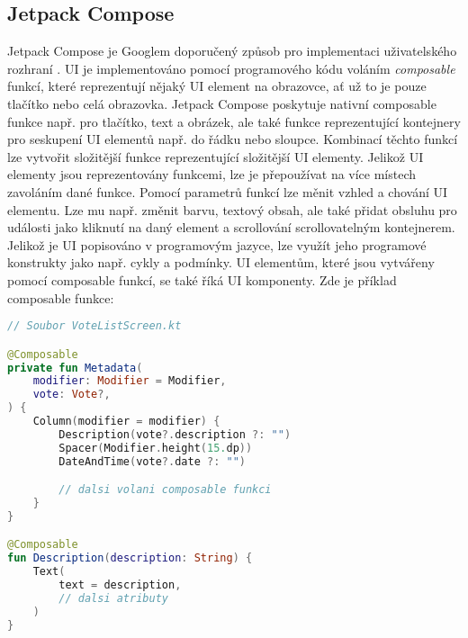 \subsection*{Jetpack Compose}
\label{ssec:jetpack-compose}
Jetpack Compose je Googlem doporučený způsob pro implementaci uživatelského rozhraní \cite{jetpack-compose}. UI je implementováno pomocí programového kódu voláním \textit{composable} funkcí, které reprezentují nějaký UI element na obrazovce, ať už to je pouze tlačítko nebo celá obrazovka. Jetpack Compose poskytuje nativní composable funkce např. pro tlačítko, text a obrázek, ale také funkce reprezentující kontejnery pro seskupení UI elementů např. do řádku nebo sloupce. Kombinací těchto funkcí lze vytvořit složitější funkce reprezentující složitější UI elementy. Jelikož UI elementy jsou reprezentovány funkcemi, lze je přepoužívat na více místech zavoláním dané funkce. Pomocí parametrů funkcí lze měnit vzhled a chování UI elementu. Lze mu např. změnit \linebreak barvu, textový obsah, ale také přidat obsluhu pro události jako kliknutí na daný element a scrollování scrollovatelným kontejnerem. Jelikož je UI popisováno v programovým jazyce, lze využít jeho programové konstrukty jako např. cykly a podmínky. UI elementům, které jsou vytvářeny pomocí composable funkcí, se také říká UI komponenty. Zde je příklad composable funkce:

\begin{lstlisting}[caption={Ukázka composable funkce}, label={lst:composable-example}, tabsize=2, language=Kotlin]
// Soubor VoteListScreen.kt

@Composable
private fun Metadata(
	modifier: Modifier = Modifier,
	vote: Vote?,
) {
	Column(modifier = modifier) {
		Description(vote?.description ?: "")
		Spacer(Modifier.height(15.dp))
		DateAndTime(vote?.date ?: "")

		// dalsi volani composable funkci
	}
}

@Composable
fun Description(description: String) {
	Text(
		text = description,
		// dalsi atributy
	)
}

\end{lstlisting}

